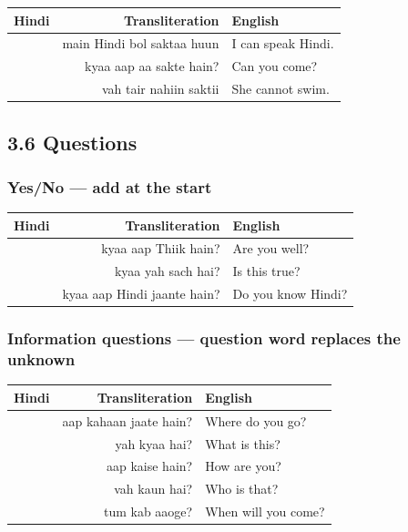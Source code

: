 
\begin{tabular}{@{}HRG@{}}
  \toprule
  Hindi & Transliteration & English \\
  \midrule
    & main Hindi bol saktaa huun & I can speak Hindi. \\
        & kyaa aap aa sakte hain?     & Can you come? \\
          & vah tair nahiin saktii      & She cannot swim. \\
  \bottomrule
\end{tabular}

\subsection{3.6 Questions}

\subsubsection*{Yes/No — add  at the start}


\begin{tabular}{@{}HRG@{}}
  \toprule
  Hindi & Transliteration & English \\
  \midrule
          & kyaa aap Thiik hain?   & Are you well? \\
            & kyaa yah sach hai?      & Is this true? \\
   & kyaa aap Hindi jaante hain? & Do you know Hindi? \\
  \bottomrule
\end{tabular}

\subsubsection*{Information questions — question word replaces the unknown}


\begin{tabular}{@{}HRG@{}}
  \toprule
  Hindi & Transliteration & English \\
  \midrule
         & aap kahaan jaate hain? & Where do you go? \\
               & yah kyaa hai?           & What is this? \\
              & aap kaise hain?         & How are you? \\
                & vah kaun hai?           & Who is that? \\
              & tum kab aaoge?          & When will you come? \\
  \bottomrule
\end{tabular}

